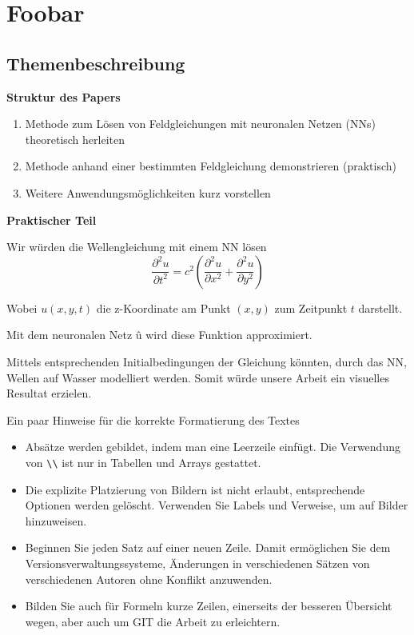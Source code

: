 %
%
%
%
\chapter{Foobar\label{chapter:neuronal}}
\begin{refsection}

\section{Themenbeschreibung}
\textbf{Struktur des Papers}
\begin{enumerate}
    \item Methode zum Lösen von Feldgleichungen mit neuronalen Netzen (NNs) theoretisch herleiten
    \item Methode anhand einer bestimmten Feldgleichung demonstrieren (praktisch)
    \item Weitere Anwendungsmöglichkeiten kurz vorstellen\newline
\end{enumerate}

\textbf{Praktischer Teil}

Wir würden die Wellengleichung mit einem NN lösen
\begin{equation}
    \frac{\partial^2 u}{\partial t^2} = c^2 \left( \frac{\partial^2 u}{\partial x^2} + \frac{\partial^2 u}{\partial y^2} \right)
\end{equation}


Wobei \( u(x, y, t) \) die z-Koordinate am Punkt \( (x, y) \) zum Zeitpunkt \( t \) darstellt.

Mit dem neuronalen Netz \^{u} wird diese Funktion approximiert.\newline

Mittels entsprechenden Initialbedingungen der Gleichung könnten, durch das NN, Wellen auf Wasser modelliert werden.
Somit würde unsere Arbeit ein visuelles Resultat erzielen.\newline

Ein paar Hinweise für die korrekte Formatierung des Textes
\begin{itemize}
\item
Absätze werden gebildet, indem man eine Leerzeile einfügt.
Die Verwendung von \verb+\\+ ist nur in Tabellen und Arrays gestattet.
\item
Die explizite Platzierung von Bildern ist nicht erlaubt, entsprechende
Optionen werden gelöscht. 
Verwenden Sie Labels und Verweise, um auf Bilder hinzuweisen.
\item
Beginnen Sie jeden Satz auf einer neuen Zeile. 
Damit ermöglichen Sie dem Versionsverwaltungssysteme, Änderungen
in verschiedenen Sätzen von verschiedenen Autoren ohne Konflikt 
anzuwenden.
\item 
Bilden Sie auch für Formeln kurze Zeilen, einerseits der besseren
Übersicht wegen, aber auch um GIT die Arbeit zu erleichtern.
\end{itemize}






\printbibliography[heading=subbibliography]
\end{refsection}
